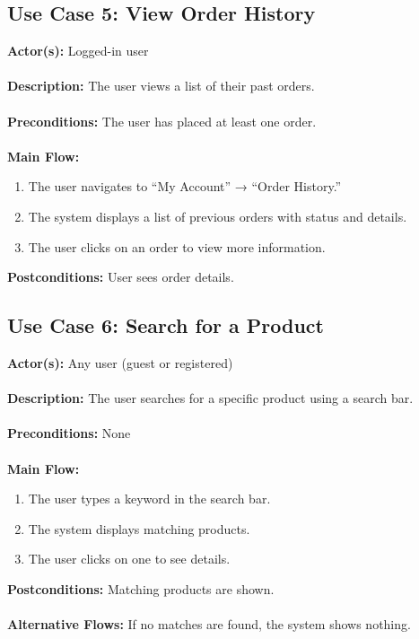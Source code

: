 \documentclass[a4paper,12pt]{article.cls}
\begin{document}
	\subsection*{Use Case 5: View Order History}
	\textbf{Actor(s):} Logged-in user \\ \\
	\textbf{Description:} The user views a list of their past orders. \\ \\
	\textbf{Preconditions:} The user has placed at least one order. \\ \\
	\textbf{Main Flow:}
	\begin{enumerate}
  		\item The user navigates to ``My Account'' → ``Order History.''
  		\item The system displays a list of previous orders with status and details.
  		\item The user clicks on an order to view more information.
	\end{enumerate}
	\textbf{Postconditions:} User sees order details.
	\subsection*{Use Case 6: Search for a Product}
	\textbf{Actor(s):} Any user (guest or registered) \\ \\
	\textbf{Description:} The user searches for a specific product using a search bar. \\ \\
	\textbf{Preconditions:} None \\ \\
	\textbf{Main Flow:}
	\begin{enumerate}
  		\item The user types a keyword in the search bar.
  		\item The system displays matching products.
  		\item The user clicks on one to see details.
	\end{enumerate}
	\textbf{Postconditions:} Matching products are shown. \\ \\
	\textbf{Alternative Flows:} If no matches are found, the system shows nothing.
\end{document}
